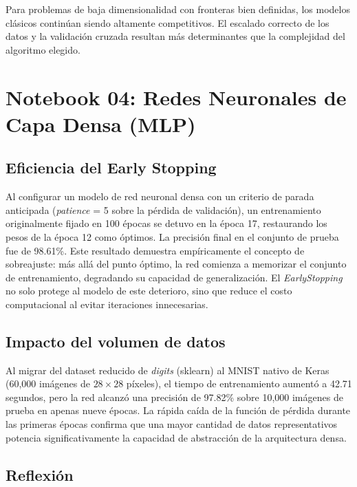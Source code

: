 \documentclass[12pt, a4paper]{article}
\begin{document}
Para problemas de baja dimensionalidad con fronteras bien definidas, los modelos clásicos continúan siendo altamente competitivos. El escalado correcto de los datos y la validación cruzada resultan más determinantes que la complejidad del algoritmo elegido.

\section{Notebook 04: Redes Neuronales de Capa Densa (MLP)}

\subsection{Eficiencia del Early Stopping}

Al configurar un modelo de red neuronal densa con un criterio de parada anticipada (\textit{patience} = 5 sobre la pérdida de validación), un entrenamiento originalmente fijado en 100 épocas se detuvo en la época 17, restaurando los pesos de la época 12 como óptimos. La precisión final en el conjunto de prueba fue de 98.61\%. Este resultado demuestra empíricamente el concepto de sobreajuste: más allá del punto óptimo, la red comienza a memorizar el conjunto de entrenamiento, degradando su capacidad de generalización. El \textit{EarlyStopping} no solo protege al modelo de este deterioro, sino que reduce el costo computacional al evitar iteraciones innecesarias.

\subsection{Impacto del volumen de datos}

Al migrar del dataset reducido de \textit{digits} (sklearn) al MNIST nativo de Keras (60,000 imágenes de $28 \times 28$ píxeles), el tiempo de entrenamiento aumentó a 42.71 segundos, pero la red alcanzó una precisión de 97.82\% sobre 10,000 imágenes de prueba en apenas nueve épocas. La rápida caída de la función de pérdida durante las primeras épocas confirma que una mayor cantidad de datos representativos potencia significativamente la capacidad de abstracción de la arquitectura densa.

\subsection{Reflexión}
\end{document}
